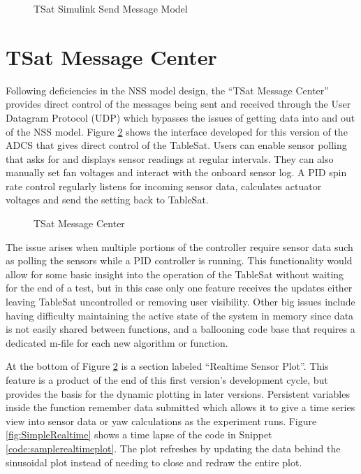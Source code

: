 \begin{figure}[ht]
  \centerline{}
  \caption{TSat Simulink Send Message Model}
  \label{fig:TSatSimulinkSendMessageModel}
\end{figure}

\section{TSat Message Center}
\label{sec:TSatMessageCenter}

Following deficiencies in the NSS model design, the ``TSat Message Center'' provides direct control of the messages being sent and received through the User Datagram Protocol (UDP) which bypasses the issues of getting data into and out of the NSS model.  Figure \ref{fig:TSatMessageCenter} shows the interface developed for this version of the ADCS that gives direct control of the TableSat.  Users can enable sensor polling that asks for and displays sensor readings at regular intervals.  They can also manually set fan voltages and interact with the onboard sensor log.  A PID spin rate control regularly listens for incoming sensor data, calculates actuator voltages and send the setting back to TableSat.
\begin{figure}[ht]
  \centerline{}
  \caption{TSat Message Center}
  \label{fig:TSatMessageCenter}
\end{figure}

The issue arises when multiple portions of the controller require sensor data such as polling the sensors while a PID controller is running.  This functionality would allow for some basic insight into the operation of the TableSat without waiting for the end of a test, but in this case only one feature receives the updates either leaving TableSat uncontrolled or removing user visibility.  Other big issues include having difficulty maintaining the active state of the system in memory since data is not easily shared between functions, and a ballooning code base that requires a dedicated m-file for each new algorithm or function.

At the bottom of Figure \ref{fig:TSatMessageCenter} is a section labeled ``Realtime Sensor Plot''.  This feature is a product of the end of this first version's development cycle, but provides the basis for the dynamic plotting in later versions.  Persistent variables inside the function remember data submitted which allows it to give a time series view into sensor data or yaw calculations as the experiment runs.  Figure \ref{fig:SimpleRealtime} shows a time lapse of the code in Snippet \ref{code:samplerealtimeplot}.  The plot refreshes by updating the data behind the sinusoidal plot instead of needing to close and redraw the entire plot.

